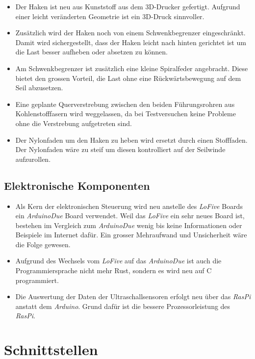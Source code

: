 \documentclass[a4paper]{report}
\begin{document}
\begin{itemize}
		\item Der Haken ist neu aus Kunststoff aus dem 3D-Drucker gefertigt. Aufgrund einer leicht veränderten Geometrie ist ein 3D-Druck sinnvoller.
		\item Zusätzlich wird der Haken noch von einem Schwenkbegrenzer eingeschränkt. Damit wird sichergestellt, dass der Haken leicht nach hinten gerichtet ist um die Last besser aufheben oder absetzen zu können.
		\item Am Schwenkbegrenzer ist zusätzlich eine kleine Spiralfeder angebracht. Diese bietet den grossen Vorteil, die Last ohne eine Rückwärtsbewegung auf dem Seil abzusetzen.
		\item Eine geplante Querverstrebung zwischen den beiden Führungsrohren aus Kohlenstofffasern wird weggelassen, da bei Testversuchen keine Probleme ohne die Verstrebung aufgetreten sind.
		\item Der Nylonfaden um den Haken zu heben wird ersetzt durch einen Stofffaden. Der Nylonfaden wäre zu steif um diesen kontrolliert auf der Seilwinde aufzurollen.
\end{itemize}

\subsection{Elektronische Komponenten}

\begin{itemize}
		\item Als Kern der elektronischen Steuerung wird neu anstelle des \textit{LoFive} Boards ein \textit{ArduinoDue} Board verwendet. Weil das \textit{LoFive} ein sehr neues Board ist, bestehen im Vergleich zum \textit{ArduinoDue} wenig bis keine Informationen oder Beispiele im Internet dafür. Ein grosser Mehraufwand und Unsicherheit wäre die Folge gewesen.
		\item Aufgrund des Wechsels vom \textit{LoFive} auf das \textit{ArduinoDue} ist auch die Programmiersprache nicht mehr Rust, sondern es wird neu auf C programmiert.
		\item Die Auswertung der Daten der Ultraschallsensoren erfolgt neu über das \textit{RasPi} anstatt dem \textit{Arduino}. Grund dafür ist die bessere Prozessorleistung des \textit{RasPi}.
\end{itemize}


\section{Schnittstellen}
\label{sec:Schnittstellen}
\end{document}
